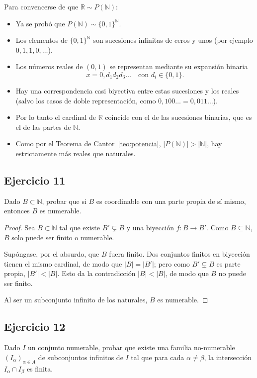 \documentclass[11pt, a4paper]{article}
\begin{document}
Para convencerse de que $\mathbb{R} \sim P(\mathbb{N})$:
\begin{itemize}
    \item Ya se probó que $P(\mathbb{N}) \sim \{0,1\}^{\mathbb{N}}$.
    \item Los elementos de $\{0,1\}^{\mathbb{N}}$ son sucesiones infinitas de ceros y unos (por
    ejemplo $0, 1, 1, 0, \dots$).
    \item Los números reales de $(0,1)$ se representan mediante su expansión binaria
    $$ x = 0,d_1 d_2 d_3 \dots \quad \text{con } d_i \in \{0,1\}. $$
    \item Hay una correspondencia casi biyectiva entre estas sucesiones y los reales (salvo los casos
    de doble representación, como $0,100\dots = 0,011\dots$).
    \item Por lo tanto el cardinal de $\mathbb{R}$ coincide con el de las sucesiones binarias, que es
    el de las partes de $\mathbb{N}$.
    \item Como por el Teorema de Cantor~\ref{teo:potencia}, $|P(\mathbb{N})| > |\mathbb{N}|$, hay
    estrictamente más reales que naturales.
\end{itemize}

\subsection*{Ejercicio 11}

Dado $B \subset \mathbb{N}$, probar que si $B$ es coordinable con una parte propia de sí mismo,
entonces $B$ es numerable.

\begin{proof}
Sea $B \subset \mathbb{N}$ tal que existe $B' \subsetneq B$ y una biyección $f: B \to B'$. Como
$B \subseteq \mathbb{N}$, $B$ solo puede ser finito o numerable.

Supóngase, por el absurdo, que $B$ fuera finito. Dos conjuntos finitos en biyección tienen el mismo cardinal, de modo que
$|B| = |B'|$; pero como $B' \subsetneq B$ es parte propia, $|B'| < |B|$. Esto da la contradicción
$|B| < |B|$, de modo que $B$ no puede ser finito.

Al ser un subconjunto infinito de los naturales, $B$ es numerable.
\end{proof}

\subsection*{Ejercicio 12}

Dado $I$ un conjunto numerable, probar que existe una familia no-numerable
$(I_{\alpha})_{\alpha \in A}$ de subconjuntos infinitos de $I$ tal que para cada
$\alpha \neq \beta$, la intersección $I_{\alpha} \cap I_{\beta}$ es finita.
\end{document}
